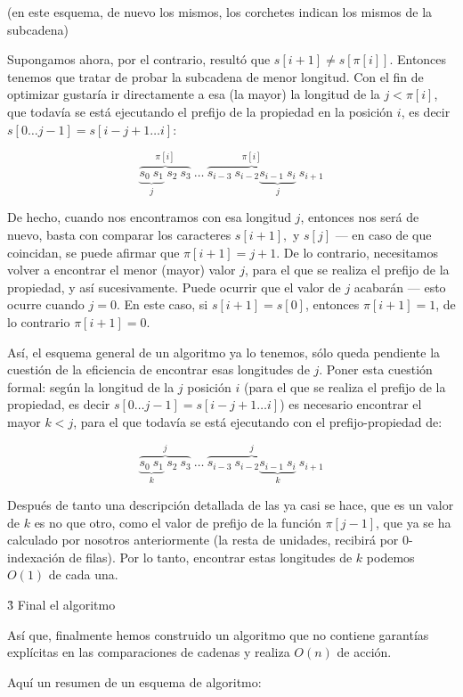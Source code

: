 (en este esquema, de nuevo los mismos, los corchetes indican los mismos de la subcadena)

Supongamos ahora, por el contrario, resultó que $s[i+1] \ne s[\pi[i]]$. Entonces tenemos que tratar de probar la subcadena de menor longitud. Con el fin de optimizar gustaría ir directamente a esa (la mayor) la longitud de la $j < \pi[i]$, que todavía se está ejecutando el prefijo de la propiedad en la posición $i$, es decir $s[0 \ldots j-1] = s[i-j+1 \ldots i]$:

$$ \overbrace{\underbrace{s_0 \ s_1}_{j} \ s_2 \ s_3}^{\pi[i]} \ \ldots\ \overbrace{ s_{i-3}\ s_{i-2} \underbrace{s_{i-1}\ s_{i}}_{j}}^{\pi[i]} \ s_{i+1} $$

De hecho, cuando nos encontramos con esa longitud $j$, entonces nos será de nuevo, basta con comparar los caracteres $s[i+1],$ y $s[j]$ --- en caso de que coincidan, se puede afirmar que $\pi[i+1] = j+1$. De lo contrario, necesitamos volver a encontrar el menor (mayor) valor $j$, para el que se realiza el prefijo de la propiedad, y así sucesivamente. Puede ocurrir que el valor de $j$ acabarán --- esto ocurre cuando $j=0$. En este caso, si $s[i+1]=s[0]$, entonces $\pi[i+1]=1$, de lo contrario $\pi[i+1]=0$.

Así, el esquema general de un algoritmo ya lo tenemos, sólo queda pendiente la cuestión de la eficiencia de encontrar esas longitudes de $j$. Poner esta cuestión formal: según la longitud de la $j$ posición $i$ (para el que se realiza el prefijo de la propiedad, es decir $s[0 \ldots j-1] = s[i-j+1 \ldots i]$) es necesario encontrar el mayor $k < j$, para el que todavía se está ejecutando con el prefijo-propiedad de:

$$ \overbrace{\underbrace{s_0 \ s_1}_{k} \ s_2 \ s_3}^{j} \ \ldots\ \overbrace{ s_{i-3}\ s_{i-2} \underbrace{s_{i-1}\ s_{i}}_{k}}^{j} \ s_{i+1} $$

Después de tanto una descripción detallada de las ya casi se hace, que es un valor de $k$ es no que otro, como el valor de prefijo de la función $\pi[j-1]$, que ya se ha calculado por nosotros anteriormente (la resta de unidades, recibirá por 0-indexación de filas). Por lo tanto, encontrar estas longitudes de $k$ podemos $O(1)$ de cada una.

\h3{ Final el algoritmo }

Así que, finalmente hemos construido un algoritmo que no contiene garantías explícitas en las comparaciones de cadenas y realiza $O(n)$ de acción.

Aquí un resumen de un esquema de algoritmo:

